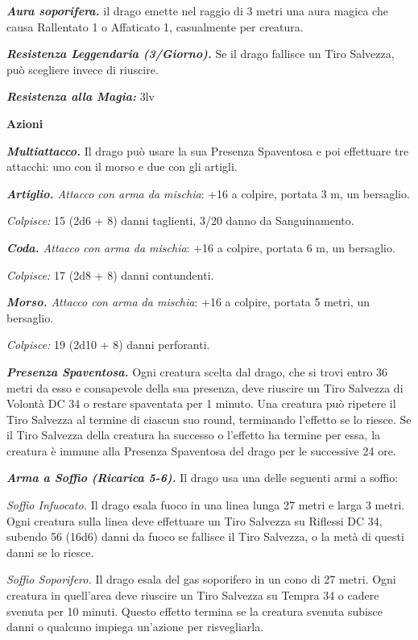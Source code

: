 \begin{multicols}{2}
{\emph{\textbf{Aura soporifera.}} il drago emette nel raggio di 3 metri una aura magica che causa Rallentato 1 o Affaticato 1, casualmente per creatura.

\emph{\textbf{Resistenza Leggendaria (3/Giorno).}} Se il drago fallisce un Tiro Salvezza, può scegliere invece di riuscire.

\emph{\textbf{Resistenza alla Magia:}} 3lv

\textbf{Azioni}

\emph{\textbf{Multiattacco.}} Il drago può usare la sua Presenza Spaventosa e poi effettuare tre attacchi: uno con il morso e due con gli artigli.

\emph{\textbf{Artiglio.} Attacco con arma da mischia}: +16 a colpire, portata 3 m, un bersaglio.

\emph{Colpisce:} 15 (2d6 + 8) danni taglienti, 3/20 danno da Sanguinamento.

\emph{\textbf{Coda.} Attacco con arma da mischia}: +16 a colpire, portata 6 m, un bersaglio.

\emph{Colpisce:} 17 (2d8 + 8) danni contundenti.

\emph{\textbf{Morso.} Attacco con arma da mischia}: +16 a colpire, portata 5 metri, un bersaglio.

\emph{Colpisce:} 19 (2d10 + 8) danni perforanti.

\emph{\textbf{Presenza Spaventosa.}} Ogni creatura scelta dal drago, che si trovi entro 36 metri da esso e consapevole della sua presenza, deve riuscire un Tiro Salvezza di Volontà DC 34 o restare spaventata per 1 minuto. Una creatura può ripetere il Tiro Salvezza al termine di ciascun suo round, terminando l'effetto se lo riesce. Se il Tiro Salvezza della creatura ha successo o l'effetto ha termine per essa, la creatura è immune alla Presenza Spaventosa del drago per le successive 24 ore.

\emph{\textbf{Arma a Soffio (Ricarica 5-6).}} Il drago usa una delle seguenti armi a soffio:

\emph{Soffio Infuocato.} Il drago esala fuoco in una linea lunga 27 metri e larga 3 metri. Ogni creatura sulla linea deve effettuare un Tiro Salvezza su Riflessi DC 34, subendo 56 (16d6) danni da fuoco se fallisce il Tiro Salvezza, o la metà di questi danni se lo riesce.

\emph{Soffio Soporifero.} Il drago esala del gas soporifero in un cono di 27 metri. Ogni creatura in quell'area deve riuscire un Tiro Salvezza su Tempra 34 o cadere svenuta per 10 minuti. Questo effetto termina se la creatura svenuta subisce danni o qualcuno impiega un'azione per risvegliarla.

}
\end{multicols}
